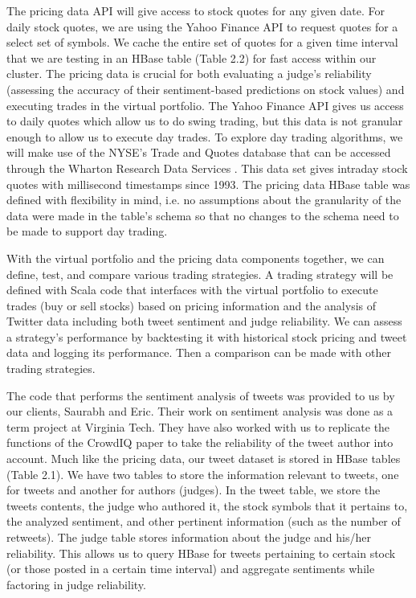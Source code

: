The pricing data API will give access to stock quotes for any given date. For daily stock quotes, we are using the Yahoo Finance API to request quotes for a select set of symbols. We cache the entire set of quotes for a given time interval that we are testing in an HBase table (Table 2.2) for fast access within our cluster. The pricing data is crucial for both evaluating a judge's reliability (assessing the accuracy of their sentiment-based predictions on stock values) and executing trades in the virtual portfolio. The Yahoo Finance API gives us access to daily quotes which allow us to do swing trading, but this data is not granular enough to allow us to execute day trades. To explore day trading algorithms, we will make use of the NYSE's Trade and Quotes database that can be accessed through the Wharton Research Data Services \cite{wrds}. This data set gives intraday stock quotes with millisecond timestamps since 1993. The pricing data HBase table was defined with flexibility in mind, i.e. no assumptions about the granularity of the data were made in the table's schema so that no changes to the schema need to be made to support day trading.

With the virtual portfolio and the pricing data components together, we can define, test, and compare various trading strategies. A trading strategy will be defined with Scala code that interfaces with the virtual portfolio to execute trades (buy or sell stocks) based on pricing information and the analysis of Twitter data including both tweet sentiment and judge reliability. We can assess a strategy's performance by backtesting it with historical stock pricing and tweet data and logging its performance. Then a comparison can be made with other trading strategies.

The code that performs the sentiment analysis of tweets was provided to us by our clients, Saurabh and Eric. Their work on sentiment analysis was done as a term project at Virginia Tech. They have also worked with us to replicate the functions of the CrowdIQ paper to take the reliability of the tweet author into account. Much like the pricing data, our tweet dataset is stored in HBase tables (Table 2.1). We have two tables to store the information relevant to tweets, one for tweets and another for authors (judges). In the tweet table, we store the tweets contents, the judge who authored it, the stock symbols that it pertains to, the analyzed sentiment, and other pertinent information (such as the number of retweets). The judge table stores information about the judge and his/her reliability. This allows us to query HBase for tweets pertaining to certain stock (or those posted in a certain time interval) and aggregate sentiments while factoring in judge reliability.

